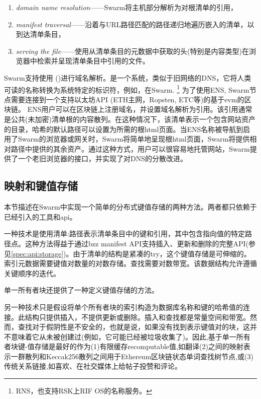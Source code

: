 \begin{enumerate}
    \item \emph{domain name resolution}——Swarm将主机部分解析为对根清单的引用，
    \item \emph{manifest traversal}——沿着与URL路径匹配的路径递归地遍历嵌入的清单，以到达清单条目，
    \item \emph{serving the file}——使用从清单条目的元数据中获取的头(特别是内容类型)在浏览器中检索并呈现清单条目中引用的文件。
\end{enumerate}

Swarm支持使用 ()进行域名解析。是一个系统，类似于旧网络的DNS，它将人类可读的名称转换为系统特定的标识符，例如，在Swarm.%
\footnote{RNS，也支持RSK上RIF OS的名称服务。}
%
为了使用ENS, Swarm节点需要连接到一个支持以太坊API (ETH主网，Ropsten, ETC等)的基于evm的区块链。 
ENS用户可以在区块链上注册域名，并设置域名解析为引用。该引用通常是公共(未加密)清单根的内容散列。在这种情况下，该清单表示一个包含网站资产的目录，哈希的默认路径可以设置为所需的根html页面。当ENS名称被导航到启用了Swarm的浏览器或网关时，Swarm将简单地呈现根html页面，Swarm将提供相对路径中提供的其余资产。通过这种方式，用户可以很容易地托管网站，Swarm提供了一个老旧浏览器的接口，并实现了对DNS的分散改进。


\subsection{映射和键值存储\statusgreen}\label{sec:maps}

本节描述在Swarm中实现一个简单的分布式键值存储的两种方法。两者都只依赖于已经引入的工具和api。

一种技术是使用清单:路径表示清单条目中的键和引用，其中包含指向值的特定路径点。这种方法得益于通过bzz manifest API支持插入、更新和删除的完整API(参见\ref{spec:api:storage})。由于清单的结构是紧凑的try，这个键值存储是可伸缩的。索引元数据需要键值对数量的对数存储。查找需要对数带宽。该数据结构允许遵循关键顺序的迭代。

单一所有者块还提供了一种定义键值存储的方法。

另一种技术只是假设将单个所有者块的索引构造为数据库名称和键的哈希值的连接。此结构只提供插入，不提供更新或删除。插入和查找都是常量空间和带宽。然而，查找对于假阴性是不安全的，也就是说，如果没有找到表示键值对的块，这并不意味着它从未被创建过(例如，它可能已经被垃圾收集了)。因此,基于单一所有者块键-值存储是最好的作为(1)有限缓存recomputable值,如翻译(2)之间的映射表示一群散列和Keccak256散列之间用于Ethereum区块链状态单词查找树节点,或(3)传统关系链接,如喜欢、在社交媒体上给帖子投赞和评论。 


